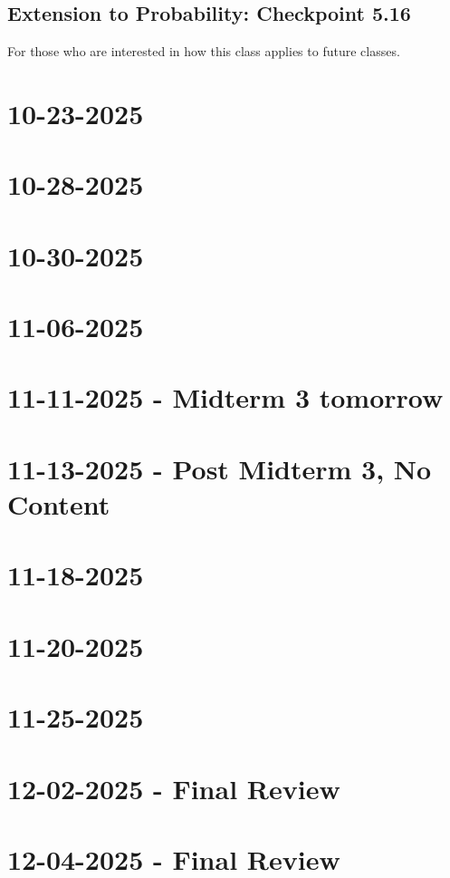 \documentclass[]{mangos-musings}
\begin{document}
\subsection{Extension to Probability: Checkpoint 5.16}
For those who are interested in how this class applies to future classes.

\newpage
\section{10-23-2025}

\newpage
\section{10-28-2025}

\newpage
\section{10-30-2025}

\newpage
\section{11-06-2025}

\newpage
\section{11-11-2025 - Midterm 3 tomorrow}

\newpage
\section{11-13-2025 - Post Midterm 3, No Content}

\newpage
\section{11-18-2025}

\newpage
\section{11-20-2025}

\newpage
\section{11-25-2025}

\newpage
\section{12-02-2025 - Final Review}

\newpage
\section{12-04-2025 - Final Review}
\end{document}
